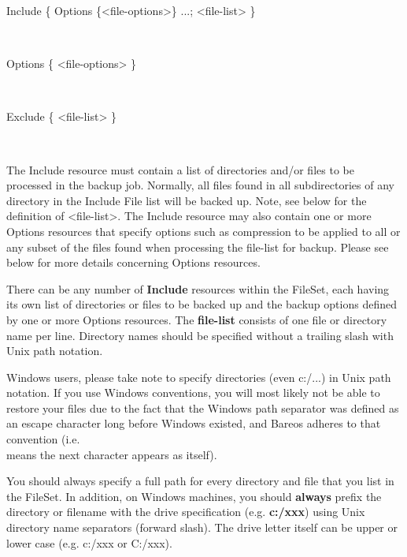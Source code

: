 \begin{description}
\item [Include \{ Options \{{\textless}file-options{\textgreater}\} ...;
   {\textless}file-list{\textgreater} \} ] \hfill \\

\item [Options \{ {\textless}file-options{\textgreater} \} ] \hfill \\

\item [Exclude \{ {\textless}file-list{\textgreater} \}] \hfill \\

\end{description}

The Include resource must contain a list of directories and/or files to be
processed in the backup job.  Normally, all files found in all
subdirectories of any directory in the Include File list will be backed up.
Note, see below for the definition of {\textless}file-list{\textgreater}.
The Include resource may also contain one or more Options resources that
specify options such as compression to be applied to all or any subset of
the files found when processing the file-list for backup. Please see
below for more details concerning Options resources.

There can be any number of {\bf Include} resources within the FileSet, each
having its own list of directories or files to be backed up and the backup
options defined by one or more Options resources.  The {\bf file-list}
consists of one file or directory name per line.  Directory names should be
specified without a trailing slash with Unix path notation.

Windows users, please take note to specify directories (even c:/...) in
Unix path notation. If you use Windows conventions, you will most likely
not be able to restore your files due to the fact that the Windows
path separator was defined as an escape character long before Windows
existed, and Bareos adheres to that convention (i.e. \\  means the next character
appears as itself).

You should always specify a full path for every directory and file that you
list in the FileSet.  In addition, on Windows machines, you should {\bf
always} prefix the directory or filename with the drive specification
(e.g.  {\bf c:/xxx}) using Unix directory name separators
(forward slash).  The drive letter itself can be upper or lower case (e.g.
c:/xxx or C:/xxx).

